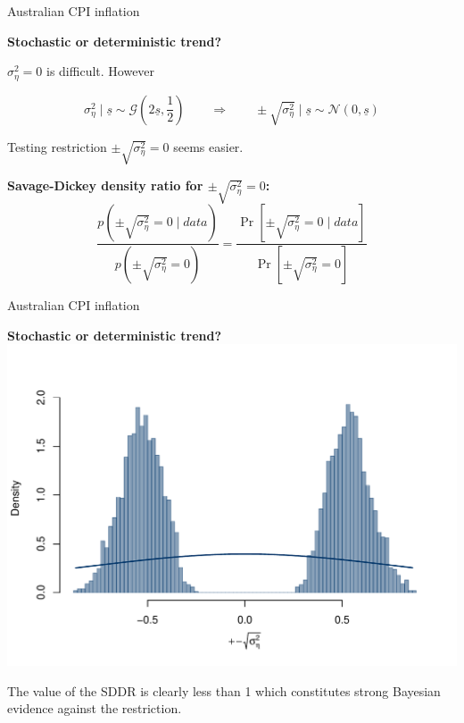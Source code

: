 \documentclass[notes,blackandwhite,mathsans,usenames,dvipsnames]{beamer}
\begin{document}
\begin{frame}{Australian CPI inflation}

\smallskip\textbf{Stochastic or deterministic trend?}

 $\sigma^2_\eta=0$ {\color{mcxs2}is difficult. However}

$$
\sigma^2_\eta\mid\underline{s} \sim\mathcal{G}\left(2\underline{s}, \frac{1}{2}\right) \qquad\Rightarrow\qquad
\pm\sqrt{\sigma^2_\eta}\mid\underline{s} \sim\mathcal{N}\left(0, \underline{s}\right) 
$$

{\color{mcxs2}Testing restriction} $\pm\sqrt{\sigma^2_\eta}=0$ {\color{mcxs2}seems easier.}

\bigskip\textbf{Savage-Dickey density ratio for $\pm\sqrt{\sigma^2_\eta}=0$:}
$$
\frac{p\left(\pm\sqrt{\sigma^2_\eta}=0\mid data\right)}{p\left(\pm\sqrt{\sigma^2_\eta}=0\right)} = \frac{\Pr\left[\pm\sqrt{\sigma^2_\eta}=0\mid data\right]}{\Pr\left[\pm\sqrt{\sigma^2_\eta}=0\right]}
$$

\end{frame}


\begin{frame}{Australian CPI inflation}

\smallskip\textbf{Stochastic or deterministic trend?}
\centering
\includegraphics[scale=0.5, trim=2cm 0.5cm 2cm 1cm]{results/pi-gamma-omega.pdf}

{\color{mcxs2}The value of the SDDR is clearly less than 1 which constitutes strong Bayesian evidence against the restriction.}
\end{frame}
\end{document}
